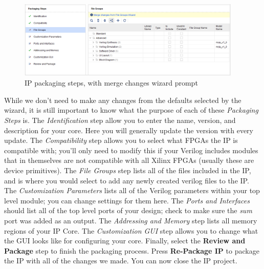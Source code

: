 \documentclass[11pt]{article}
\begin{document}
\begin{figure}[!h]
    \centering
    \includegraphics[width=0.95\textwidth]{images/merge_changes.png}
    \caption{IP packaging steps, with merge changes wizard prompt}
    \label{fig:merge_changes}
\end{figure}

While we don't need to make any changes from the defaults selected by the wizard, it is still important to know what the purpose of each of these \textit{Packaging Steps} is. The \textit{Identification} step allow you to enter the name, version, and description for your core. Here you will generally update the version with every update. The \textit{Compatibility} step allows you to select what FPGAs the IP is compatible with; you'll only need to modify this if your Verilog includes modules that in themselves are not compatible with all Xilinx FPGAs (usually these are device primitives). The \textit{File Groups} step lists all of the files included in the IP, and is where you would select to add any newly created verilog files to the IP. The \textit{Customization Parameters} lists all of the Verilog parameters within your top level module; you can change settings for them here. The \textit{Ports and Interfaces} should list all of the top level ports of your design; check to make sure the \textit{sum} port was added as an output. The \textit{Addressing and Memory} step lists all memory regions of your IP Core. The \textit{Customization GUI} step allows you to change what the GUI looks like for configuring your core. Finally, select the \textbf{Review and Package} step to finish the packaging process. Press \textbf{Re-Package IP} to package the IP with all of the changes we made. You can now close the IP project.
\end{document}

